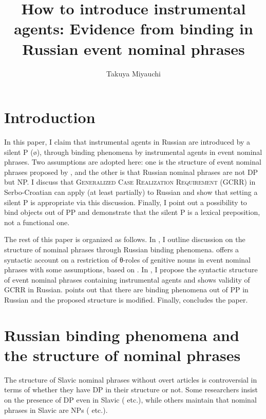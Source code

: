 \documentclass[output=paper,
]{langscibook}
\title{How to introduce instrumental agents: Evidence from binding in Russian event nominal phrases}
\author{%
 Takuya Miyauchi\affiliation{Tokyo University of Foreign Studies and\\Japan Society for the Promotion of Science}
}
\begin{document}
%
\maketitle
{}

\section{Introduction}
In this paper, I claim that instrumental agents in Russian are introduced by a silent P (ø), through binding phenomena by instrumental agents in event nominal phrases. Two assumptions are adopted here: one is the structure of event nominal phrases proposed by \cite{MiyauchiIto2016, Miyauchi2017b}, and the other is that Russian nominal phrases are not DP but NP. I discuss that \textsc{Generalized Case Realization Requirement} (GCRR) in Serbo-Croatian \citep{Horvath2014} can apply (at least partially) to Russian and show that setting a silent P is appropriate via this discussion. Finally, I point out a possibility to bind objects out of PP and demonstrate that the silent P is a lexical preposition, not a functional one. 


The rest of this paper is organized as follows. In , I outline discussion on the structure of nominal phrases through  Russian binding phenomena.  offers a syntactic account on a restriction of θ-roles of genitive nouns in event nominal phrases with some assumptions, based on \cite{MiyauchiIto2016, Miyauchi2017b}. In , I propose the syntactic structure of event nominal phrases containing instrumental agents and  shows validity of GCRR in Russian.  points out that there are binding phenomena out of PP in Russian and the proposed structure is modified. Finally,  concludes the paper. 

\section{Russian binding phenomena and the structure of nominal phrases}\label{sec:BIND}

The structure of Slavic nominal phrases without overt articles is controversial in terms of whether they have DP in their structure or not. Some researchers insist on the presence of DP even in Slavic (\citealt{Progovac1998,Rappaport2002,Rutkowski2002,Basic2004,FranksPereltsvaig2004,Pereltsvaig2007a,RutokowskiMaliszewska2007,Laterza2016} etc.), while others maintain that nominal phrases in Slavic are NPs (\citealt{Zlatic1998,Trenkic2004,Boskovic2005, Boskovic2007, Boskovic2009,Petrovic2011,Despic2013} etc.).
\end{document}
